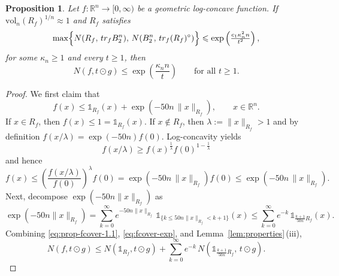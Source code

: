 \documentclass[10pt,a4paper]{amsart}
\newtheorem{proposition}{Proposition}
\newcommand{\gr}{\geqslant}
\newcommand{\ls}{\leqslant}
\newcommand{\vol}{\mathrm{vol}}
\begin{document}
\begin{proposition}\label{prop:fcover-1}
Let $f:\mathbb{R}^n\to[0,\infty)$ be a geometric log-concave function.
If $\vol_n(R_f)^{1/n}\approx 1$ and $R_f$ satisfies 
\begin{equation}\max\Bigl\{N(R_f,\, t r_f B_2^n),\,
N(B_2^n,\, t r_f (R_f)^{\circ})\Bigr\}\ls \exp\left( \tfrac{c_1 \kappa_n^2 n}{t^2}\right),
\label{eq:R-covering-a}\end{equation}
for some $\kappa_n\gr 1$ and every $t\gr 1$, then
$$N(f,t\odot g)\ls \exp\!\left(\frac{\kappa_n n}{t}\right)\qquad\text{for all } t\gr 1.$$
\end{proposition}

\begin{proof}
We first claim that
\begin{equation}\label{eq:prop-fcover-1.1}
f(x)\ls \mathds{1}_{R_f}(x)+\exp\!\left(-50n\,\|x\|_{R_f}\right),\qquad x\in\mathbb{R}^n.
\end{equation}
If $x\in R_f$, then $f(x)\ls 1=\mathds{1}_{R_f}(x)$. If $x\notin R_f$, then $\lambda:=\|x\|_{R_f}>1$ and by definition
$f(x/\lambda)=\exp(-50n)f(0)$. Log-concavity yields
$$f(x/\lambda)\gr f(x)^{\frac{1}{\lambda}}f(0)^{1-\frac{1}{\lambda}}$$
and hence
\begin{equation}\label{eq:no-need-1}f(x)\ls \left(\frac{f(x/\lambda)}{f(0)}\right)^{\lambda}f(0)=\exp\!\left(-50n\,\|x\|_{R_f}\right)f(0)
\ls \exp\!\left(-50n\,\|x\|_{R_f}\right).\end{equation}
Next, decompose $\exp(-50n\|x\|_{R_f})$ as
\begin{equation}\label{eq:fcover-exp}
\exp(-50n\|x\|_{R_f})=\sum_{k=0}^{\infty}e^{-50n\|x\|_{R_f}}
\,\mathds{1}_{\{k\ls 50n\|x\|_{R_f}<k+1\}}(x)
\ls \sum_{k=0}^{\infty}e^{-k}\,\mathds{1}_{\frac{k+1}{50n}R_f}(x).
\end{equation}
Combining \eqref{eq:prop-fcover-1.1}, \eqref{eq:fcover-exp}, and Lemma~\ref{lem:properties}\,(iii),
\begin{equation}\label{eq:fcover-sum}
N(f,t\odot g)\ls N(\mathds{1}_{R_f},t\odot g)+\sum_{k=0}^{\infty}e^{-k}\,
N(\mathds{1}_{\frac{k+1}{50n}R_f},\,t\odot g).
\end{equation}


\end{proof}
\end{document}
